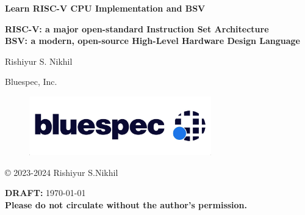
\pagestyle{empty}

\begin{center}

\vspace*{1.5in}

{\LARGE\bf Learn RISC-V CPU Implementation and BSV}

\vspace{1ex}

{\large\bf RISC-V: a major open-standard Instruction Set Architecture} \\
{\large\bf BSV: a modern, open-source High-Level Hardware Design Language}

\vspace{2cm}

{\Large Rishiyur S. Nikhil}

Bluespec, Inc.

\vspace*{0.5in}

\begin{figure}[htbp]
  \centerline{\includegraphics[height=1in,angle=0]{Figures/Bluespec_Logo_2022-10}}
\end{figure}

\vfill

\copyright{} 2023-2024 Rishiyur S.Nikhil

\vspace{0.5in}

{\bf DRAFT:} \today \\
{\bf Please do not circulate without the author's permission.}

\end{center}






\vspace*{2in}


